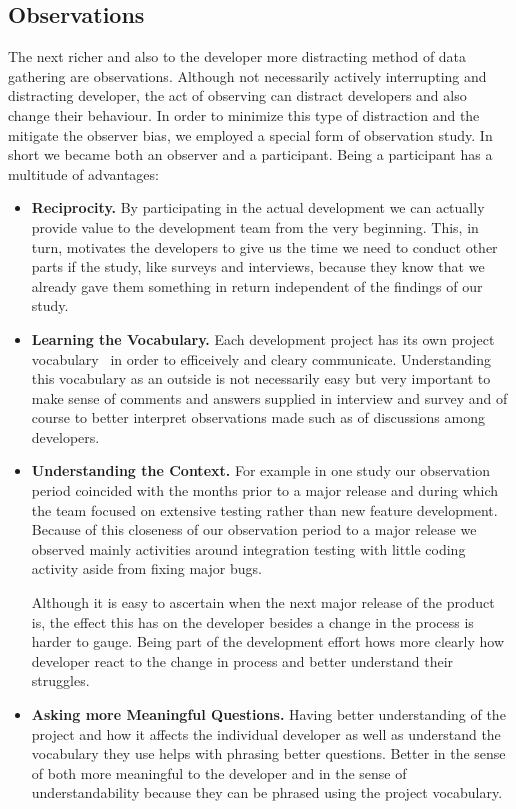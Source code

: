 \subsection{Observations}
The next richer and also to the developer more distracting method of data gathering are observations.
Although not necessarily actively interrupting and distracting developer, the act of observing can distract developers and also change their behaviour.
In order to minimize this type of distraction and the mitigate the observer bias, we employed a special form of observation study.
In short we became both an observer and a participant.
%
Being a participant has a multitude of advantages:

\begin{itemize}
\item\textbf{Reciprocity.} By participating in the actual development we can actually provide value to the development team from the very beginning.
This, in turn, motivates the developers to give us the time we need to conduct other parts if the study, like surveys and interviews, because they know that we already gave them something in return independent of the findings of our study.
\item\textbf{Learning the Vocabulary.} Each development project has its own project vocabulary~\cite{} in order to efficeively and cleary communicate. 
Understanding this vocabulary as an outside is not necessarily easy but very important to make sense of comments and answers supplied in interview and survey and of course to better interpret observations made such as of discussions among developers.
\item\textbf{Understanding the Context.} For example in one study our observation period coincided with the months prior to a major release and during which the team focused on extensive testing rather than new feature development. 
Because of this closeness of our observation period to a major release we observed mainly activities around integration testing with little coding activity aside from fixing major bugs.

Although it is easy to ascertain when the next major release of the product is, the effect this has on the developer besides a change in the process is harder to gauge.
Being part of the development effort hows more clearly how developer react to the change in process and better understand their struggles.

\item\textbf{Asking more Meaningful Questions.} Having better understanding of the project and how it affects the individual developer as well as understand the vocabulary they use helps with phrasing better questions.
Better in the sense of both more meaningful to the developer and in the sense of understandability because they can be phrased using the project vocabulary.
\end{itemize}

